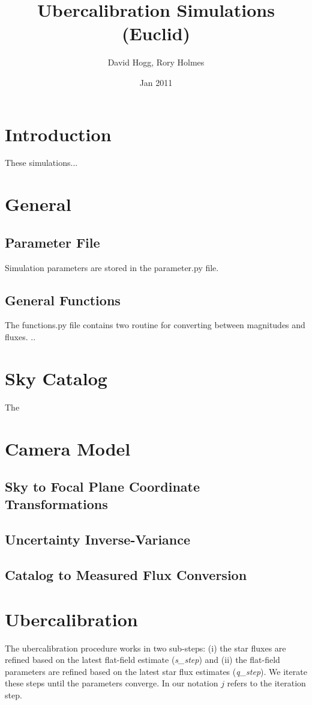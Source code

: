 \documentclass[12pt,a4paper,twoside]{article}
\author{David Hogg, Rory Holmes}
\title{Ubercalibration Simulations \\(Euclid)}
\date{Jan 2011}
\makeatletter
\def\maketitle{%
  \null
  \thispagestyle{empty}%
  \vfill
  \begin{center}\leavevmode
    \normalfont
    {\LARGE \@title\par}%
    \vskip 1cm
    {\Large \@author\par}%
    \vskip 1cm
    {\Large \@date\par}%
  \end{center}%
  \vfill
  \null
  \cleardoublepage
  }
\makeatother
\begin{document}
\maketitle

\section{Introduction}
These simulations... 

\section{General}

\subsection{Parameter File}

Simulation parameters are stored in the parameter.py file.

\subsection{General Functions}
The functions.py file contains two routine for converting between magnitudes and fluxes. ..

\section{Sky Catalog}
The 

\section{Camera Model}

\subsection{Sky to Focal Plane Coordinate Transformations}

\subsection{Uncertainty Inverse-Variance}

\subsection{Catalog to Measured Flux Conversion}

\section{Ubercalibration}
The ubercalibration procedure works in two sub-steps: (i) the star fluxes are refined based on the latest flat-field estimate (\textit{s\_step}) and (ii) the flat-field parameters are refined based on the latest star flux estimates (\textit{q\_step}). We iterate these steps until the parameters converge. In our notation $j$ refers to the iteration step. 
\end{document}
